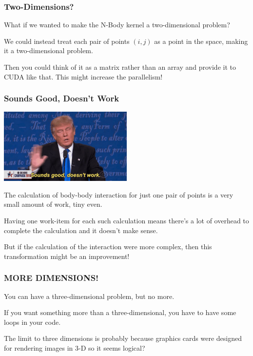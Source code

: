 \begin{frame}
\frametitle{Two-Dimensions?}

What if we wanted to make the N-Body kernel a two-dimensional problem? 

We could instead treat each pair of points $(i, j)$ as a point in the space, making it a two-dimensional problem. 

Then you could think of it as a matrix rather than an array and provide it to CUDA like that. This might increase the parallelism! 


\end{frame}


\begin{frame}
\frametitle{Sounds Good, Doesn't Work}


\begin{center}
	\includegraphics[width=0.5\textwidth]{images/soundsgood.jpg}
\end{center}

The calculation of body-body interaction for just one pair of points is a very small amount of work, tiny even. 

Having one work-item for each such calculation means there's a lot of overhead to complete the calculation and it doesn't make sense. 

But if the calculation of the interaction were more complex, then this transformation might be an improvement!

\end{frame}

\begin{frame}
\frametitle{MORE DIMENSIONS!}

You can have a three-dimensional problem, but no more.

If you want something more than a three-dimensional, you have to have some loops in your code.

The limit to three dimensions is probably because graphics cards were designed for rendering images in 3-D so it seems logical?

\end{frame}


